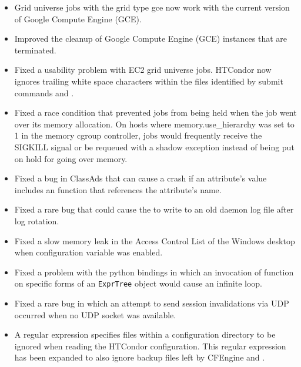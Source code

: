 \begin{itemize}

\item Grid universe jobs with the grid type gce now
work with the current version of Google Compute Engine (GCE).

\item Improved the cleanup of Google Compute Engine (GCE) instances that
are terminated.

\item Fixed a usability problem with EC2 grid universe jobs.
HTCondor now ignores trailing white space characters within the files
identified by submit commands 
and .

\item Fixed a race condition that prevented jobs from being held when
the job went over its memory allocation.  On hosts where memory.use\_hierarchy
was set to 1 in the memory cgroup controller, jobs would frequently receive
the SIGKILL signal or be requeued with a shadow exception instead of
being put on hold for going over memory. 

\item Fixed a bug in ClassAds that can cause a crash if an attribute's
value includes an  function that references the attribute's
name.

\item Fixed a rare bug that could cause the  to write to an
old daemon log file after log rotation.

\item Fixed a slow memory leak in the Access Control List of the 
Windows desktop when configuration variable
 was enabled.

\item Fixed a problem with the python bindings in which an
invocation of function 
on specific forms of an \texttt{ExprTree} object would cause an infinite loop.

\item Fixed a rare bug in which an attempt to send session invalidations 
via UDP occurred when no UDP socket was available.

\item A regular expression specifies files within a configuration directory 
to be ignored when reading the HTCondor configuration.
This regular expression has been expanded to also
ignore backup files left by CFEngine and .

\end{itemize}

